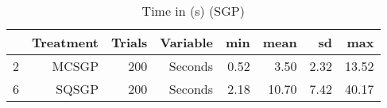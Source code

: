 \begin{table}[ht]
\centering
\begin{tabular}{rrrrrrrr}
  \hline
 & Treatment & Trials & Variable & min & mean & sd & max \\ 
  \hline
2 & MCSGP & 200 & Seconds & 0.52 & 3.50 & 2.32 & 13.52 \\ 
  6 & SQSGP & 200 & Seconds & 2.18 & 10.70 & 7.42 & 40.17 \\ 
   \hline
\end{tabular}
\caption{Time in (s) (SGP)} 
\end{table}
